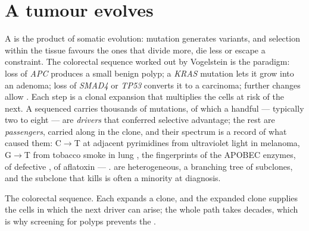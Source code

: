 \section{A tumour evolves}

\begin{proposition}\label{prop:b3:cancer-biology:multistep}
A  is the product of somatic evolution: mutation generates
variants, and selection within the tissue favours the ones that divide
more, die less or escape a constraint. The colorectal sequence
worked out by Vogelstein is the paradigm: loss of \emph{APC} produces
a small benign polyp; a \emph{KRAS} mutation lets it grow into an
adenoma; loss of \emph{SMAD4} or \emph{TP53} converts it to a carcinoma;
further changes allow . Each step is a clonal expansion that
multiplies the cells at risk of the next. A sequenced  carries
thousands of mutations, of which a handful --- typically two to eight
--- are \emph{drivers} that conferred selective advantage; the rest are
\emph{passengers}, carried along in the clone, and their spectrum is a
record of what caused them: C$\to$T at adjacent pyrimidines from
ultraviolet light in melanoma, G$\to$T from tobacco smoke in lung
, the fingerprints of the APOBEC enzymes, of defective , of aflatoxin --- \emph{}.  are
heterogeneous, a branching tree of subclones, and the subclone that
kills is often a minority at diagnosis.
\end{proposition}

\begin{omfigure}

{\small The colorectal sequence. Each  expands a clone,
and the expanded clone supplies the cells in which the next driver can
arise; the whole path takes decades, which is why screening for polyps
prevents the .}
\end{omfigure}

